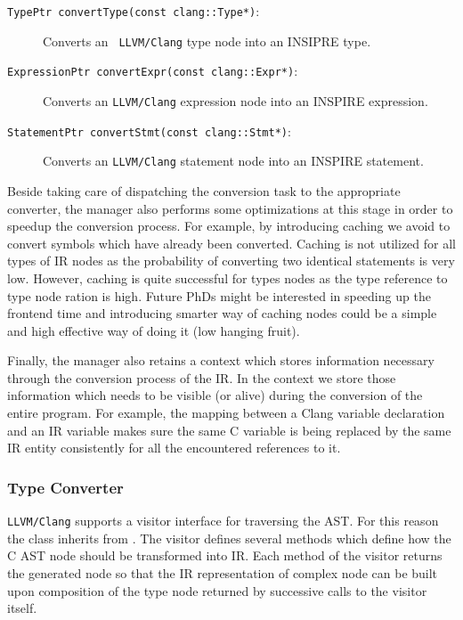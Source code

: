 \begin{description}
\item [{\tt TypePtr convertType(const clang::Type*)}:] Converts an {\tt
LLVM/Clang} type node into an INSIPRE type.

\item [{\tt ExpressionPtr convertExpr(const clang::Expr*)}:] Converts an
{\tt LLVM/Clang} expression node into an INSPIRE expression. 

\item [{\tt StatementPtr convertStmt(const clang::Stmt*)}:] Converts an
{\tt LLVM/Clang} statement node into an INSPIRE statement.

\end{description}

Beside taking care of dispatching the conversion task to the appropriate
converter, the manager also performs some optimizations at this stage in order
to speedup the conversion process. For example, by introducing caching we avoid
to convert symbols which have already been converted. Caching is not utilized
for all types of IR nodes as the probability of converting two identical
statements is very low. However, caching is quite successful for types nodes as
the type reference to type node ration is high. Future PhDs might be interested
in speeding up the frontend time and introducing smarter way of caching nodes
could be a simple and high effective way of doing it (low hanging fruit).

Finally, the manager also retains a context which stores information necessary
through the conversion process of the IR. In the context we store those
information which needs to be visible (or alive) during the conversion of the
entire program. For example, the mapping between a Clang variable declaration
and an IR variable makes sure the same C variable is being replaced by the same IR
entity consistently for all the encountered references to it. 

\subsubsection{Type Converter}
{\tt LLVM/Clang} supports a visitor interface for traversing the AST. For this
reason the class  inherits from
. The visitor defines several methods which define how
the C AST node should be transformed into IR. Each method of the visitor returns
the generated node so that the IR representation of complex node can be built
upon composition of the type node returned by successive calls to the visitor
itself. 

